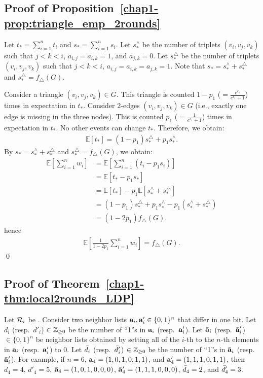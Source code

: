 {\subsection{Proof of Proposition~\ref{chap1-prop:triangle_emp_2rounds}}
Let $t_* = \sum_{i=1}^n t_i$ and $s_* = \sum_{i=1}^n s_i$. 
Let $s_*^{\wedge}$ be the number of triplets $(v_i,v_j,v_k)$ such that $j<k<i$, $a_{i,j} = a_{i,k} = 1$, and $a_{j,k} = 0$. 
Let $s_*^{\triangle}$ be the number of triplets $(v_i,v_j,v_k)$ such that $j<k<i$, $a_{i,j} = a_{i,k} = a_{j,k} =1$. 
Note that 
$s_* = s_*^{\wedge} + s_*^{\triangle}$ and 
$s_*^{\triangle} = f_\triangle(G)$. 

Consider a triangle $(v_i,v_j,v_k) \in G$. 
This triangle is counted $1-p_1$ ($= \frac{e^{\epsilon_1}}{e^{\epsilon_1}+1}$) times in expectation in $t_*$. 
Consider $2$-edges $(v_i,v_j,v_k) \in G$ (i.e., exactly one edge is missing in the three nodes). 
This is counted $p_1$ ($= \frac{1}{e^{\epsilon_1}+1}$) times in expectation in $t_*$.  
No other events can change $t_*$. 
Therefore, we obtain:
\begin{align*}
\mathbb{E}[t_*] = (1-p_1) s_*^{\triangle} + p_1 s_*^{\wedge}. 
\end{align*}
By $s_* = s_*^{\wedge} + s_*^{\triangle}$ and 
$s_*^{\triangle} = f_\triangle(G)$, we obtain:
\begin{align*}
\mathbb{E}\left[\sum_{i=1}^n w_i \right] 
&= \mathbb{E}\left[\sum_{i=1}^n (t_i - p_1 s_i) \right] \\
&= \mathbb{E}[t_* - p_1 s_*] \\
&= \mathbb{E}[t_*] - p_1 \mathbb{E}[s_*^{\wedge} + s_*^{\triangle}] \\
&= (1-p_1) s_*^{\triangle} + p_1 s_*^{\wedge} - p_1 (s_*^{\wedge} + s_*^{\triangle}) \\
&= (1 - 2 p_1) f_\triangle(G),
\end{align*}
hence 
\begin{align*}
\textstyle{\mathbb{E}\left[ \frac{1}{1-2p_1} \sum_{i=1}^n w_i \right] = f_\triangle(G).}
\end{align*}
\qed

\subsection{Proof of Theorem~\ref{chap1-thm:local2rounds_LDP}}
Let $\mathcal{R}_i$ be . 
Consider two neighbor lists $\mathbf{a}_i,\mathbf{a}'_i \in \{0,1\}^n$ that differ in one bit. 
Let $d_i$ (resp.~$d'_i$) $\in \mathbb{Z}_{\ge0}$ be the number of ``1''s in $\mathbf{a}_i$ (resp.~$\mathbf{a}'_i$). 
Let $\bar{\mathbf{a}}_i$ (resp.~$\bar{\mathbf{a}}'_i$) $\in \{0,1\}^n$ be neighbor lists obtained by setting all of the $i$-th to the $n$-th elements in $\mathbf{a}_i$ (resp.~$\mathbf{a}'_i$) to $0$. 
Let $\bar{d}_i$ (resp.~$\bar{d}'_i$) $\in \mathbb{Z}_{\ge0}$ be the number of ``1''s in $\bar{\mathbf{a}}_i$ (resp.~$\bar{\mathbf{a}}'_i$). 
For example, if $n=6$, $\mathbf{a}_4=(1,0,1,0,1,1)$, and $\mathbf{a}'_4=(1,1,1,0,1,1)$, then 
$d_4=4$, $d'_4=5$, $\bar{\mathbf{a}}_4=(1,0,1,0,0,0)$, $\bar{\mathbf{a}}'_4=(1,1,1,0,0,0)$, $\bar{d}_4=2$, and $\bar{d}'_4=3$. 

}
